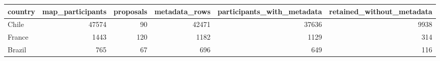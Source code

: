 \begin{tabular}{lrrrrr}
\toprule
country & map_participants & proposals & metadata_rows & participants_with_metadata & retained_without_metadata \\
\midrule
Chile & 47574 & 90 & 42471 & 37636 & 9938 \\
France & 1443 & 120 & 1182 & 1129 & 314 \\
Brazil & 765 & 67 & 696 & 649 & 116 \\
\bottomrule
\end{tabular}
